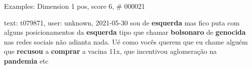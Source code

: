 \begin{frame}{Examples: Dimension 1 pos, score 6, \# 000021}
\footnotesize
\begin{exampleblock}{text: t079871, user: unknown, 2021-05-30}
sou de \textbf{esquerda} mas fico puta com alguns posicionamentos da 
\textbf{esquerda} tipo que chamar \textbf{bolsonaro} de \textbf{genocida} nas 
redes sociais não adianta nada. Ué como vocês querem que eu chame alguém que 
\textbf{recusou} a \textbf{comprar} a vacina 11x, que incentivou aglomeração na 
\textbf{pandemia} etc 
\end{exampleblock}
\end{frame}
